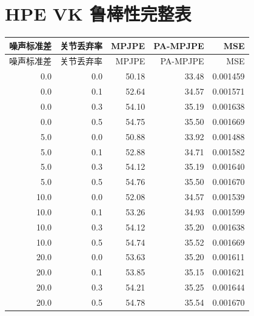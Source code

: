 \documentclass[UTF8,10pt,a4paper]{ctexart}
\begin{document}
\section{HPE VK 鲁棒性完整表}
{\scriptsize
\begin{longtable}{rrrrr}
\toprule
噪声标准差 & 关节丢弃率 & MPJPE & PA-MPJPE & MSE\\
\midrule
\endfirsthead
\toprule
噪声标准差 & 关节丢弃率 & MPJPE & PA-MPJPE & MSE\\
\midrule
\endhead
0.0 & 0.0 & 50.18 & 33.48 & 0.001459\\
0.0 & 0.1 & 52.64 & 34.57 & 0.001571\\
0.0 & 0.3 & 54.10 & 35.19 & 0.001638\\
0.0 & 0.5 & 54.75 & 35.50 & 0.001669\\
5.0 & 0.0 & 50.88 & 33.92 & 0.001488\\
5.0 & 0.1 & 52.88 & 34.71 & 0.001582\\
5.0 & 0.3 & 54.12 & 35.19 & 0.001640\\
5.0 & 0.5 & 54.76 & 35.50 & 0.001670\\
10.0 & 0.0 & 52.08 & 34.57 & 0.001539\\
10.0 & 0.1 & 53.26 & 34.93 & 0.001599\\
10.0 & 0.3 & 54.12 & 35.20 & 0.001638\\
10.0 & 0.5 & 54.74 & 35.52 & 0.001669\\
20.0 & 0.0 & 53.63 & 35.20 & 0.001611\\
20.0 & 0.1 & 53.85 & 35.15 & 0.001621\\
20.0 & 0.3 & 54.21 & 35.25 & 0.001644\\
20.0 & 0.5 & 54.78 & 35.54 & 0.001670\\
\bottomrule
\end{longtable}
}
\end{document}
